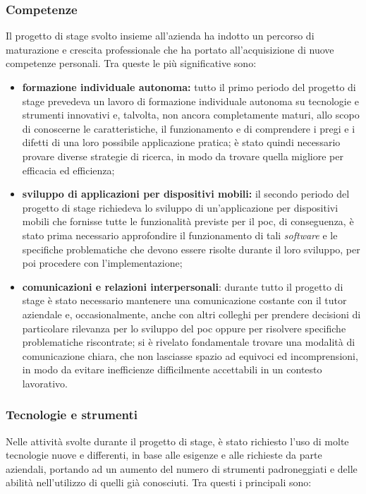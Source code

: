 \subsubsection*{Competenze}

Il progetto di stage svolto insieme all'azienda ha indotto un percorso di maturazione e crescita professionale che ha portato all'acquisizione di nuove competenze personali. Tra queste le più significative sono:

\begin{itemize}
	\item \textbf{formazione individuale autonoma:} tutto il primo periodo del progetto di stage prevedeva un lavoro di formazione individuale autonoma su tecnologie e strumenti innovativi e, talvolta, non ancora completamente maturi, allo scopo di conoscerne le caratteristiche, il funzionamento e di comprendere i pregi e i difetti di una loro possibile applicazione pratica; è stato quindi necessario provare diverse strategie di ricerca, in modo da trovare quella migliore per efficacia ed efficienza;
	\item \textbf{sviluppo di applicazioni per dispositivi mobili:} il secondo periodo del progetto di stage richiedeva lo sviluppo di un'applicazione per dispositivi mobili che fornisse tutte le funzionalità previste per il \gls{poc}, di conseguenza, è stato prima necessario approfondire il funzionamento di tali \textit{software} e le specifiche problematiche che devono essere risolte durante il loro sviluppo, per poi procedere con l'implementazione;
	\item \textbf{comunicazioni e relazioni interpersonali}: durante tutto il progetto di stage è stato necessario mantenere una comunicazione costante con il tutor aziendale e, occasionalmente, anche con altri colleghi per prendere decisioni di particolare rilevanza per lo sviluppo del \gls{poc} oppure per risolvere specifiche problematiche riscontrate; si è rivelato fondamentale trovare una modalità di comunicazione chiara, che non lasciasse spazio ad equivoci ed incomprensioni, in modo da evitare inefficienze difficilmente accettabili in un contesto lavorativo.
\end{itemize}

\subsubsection*{Tecnologie e strumenti}

Nelle attività svolte durante il progetto di stage, è stato richiesto l'uso di molte tecnologie nuove e differenti, in base alle esigenze e alle richieste da parte aziendali, portando ad un aumento del numero di strumenti padroneggiati e delle abilità nell'utilizzo di quelli già conosciuti. Tra questi i principali sono:

